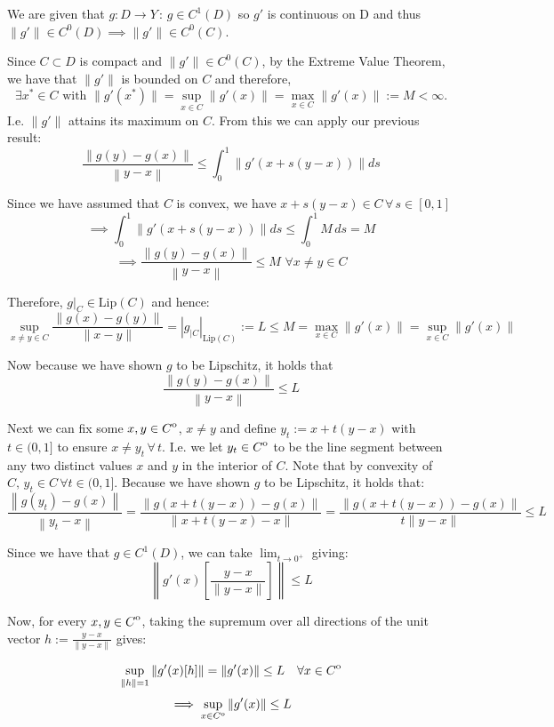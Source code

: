 \documentclass[]{article}
\newcommand{\interior}[1]{%
  {\kern0pt#1}^{\mathrm{o}}%
}
\begin{document}
\begin{enumerate}
We are given that $g: D\to Y \, : \, g\in C^1(D)$ so $g'$ is continuous on D and thus $\|g'\| \in C^0(D) \implies \|g'\| \in C^0(C)$.\newline

Since $C \subset D $ is compact and $\|g'\| \in C^0(C)$, by the Extreme Value Theorem, we have that $\|g'\|$ is bounded on $C$ and therefore, \[\exists x^* \in C \text{ with } \|g'(x^*)\|=\displaystyle \sup_{x\in C} \|g'(x)\| =\displaystyle \max_{x\in C} \|g'(x)\|  := M < \infty.\]
I.e. $\|g'\|$ attains its maximum on $C$.
From this we can apply our previous result:
\[\frac{\left\|g(y)-g(x)\right\|}{\left\|y-x\right\|} \leq \int_{0}^{1}  \left\|g'(x+s(y-x)) \right\| ds\] 

Since we have assumed that $C$ is convex, we have $x+s(y-x) \in C \, \forall \, s\in[0,1]$
\[
\implies \int_{0}^{1}  \left\|g'(x+s(y-x)) \right\| ds \leq \int_0^1M \,ds=M \]
\[\implies \frac{\left\|g(y)-g(x)\right\|}{\left\|y-x\right\|} \leq M\,\, \forall x \neq y \in C
\]


Therefore, $g|_C \in \text{Lip}(C)$ and hence:
\[
\sup_{x \neq y \in C} \frac{\|g(x) - g(y) \|}{\|x-y\|}=\left| g_{|C}\right|_{\text{Lip}(C)} := L \leq M = \max_{x\in C} \|g'(x)\| = \sup_ {x\in C} \|g'(x)\|
\]

Now because we have shown $g$ to be Lipschitz, it holds that \[\frac{\left\|g(y)-g(x)\right\|}{\left\|y-x\right\|} \leq L\]

Next we can fix some $x ,y \in \interior{C}$, $x\neq y$ and define $y_t := x + t(y-x)$ with $t \in (0,1]$ to ensure $x \neq y_t \, \forall \, t$. I.e. we let $y_t\in \interior{C}$ to be the line segment between any two distinct values $x$ and $y$ in the interior of $C$. Note that by convexity of $C,\,  y_t \in C \, \forall t\in (0,1]$. Because we have shown $g$ to be Lipschitz, it holds that:
\[
\frac{\left\|g(y_t)-g(x)\right\|}{\left\|y_t-x\right\|} =
\frac{\left\|g(x+t(y-x))-g(x)\right\|}{\left\|x + t(y-x)-x\right\|} = \frac{\left\|g(x + t(y-x))-g(x)\right\|}{t\| y-x \|}\leq L\]

Since we have that $g\in C^1(D)$, we can take $\displaystyle \lim_{t\to 0^+}$ giving:
\[
\left\|g'(x)\left[\frac{y-x}{\|y-x\|}\right]\right\| \leq L
\]

Now, for every $x,y\in \interior{C}$, taking the supremum over all directions of the unit vector $h:=\frac{y-x}{\|y-x\|}$ gives:

\[
\sup_{\|h\|=1}\|g'(x)[h]\| = \|g'(x)\| \leq L \quad \forall x\in \interior{C}
\]
\[
\implies \sup_{x\in \interior{C}}\|g'(x)\| \leq L
\]


\end{enumerate}
\end{document}
